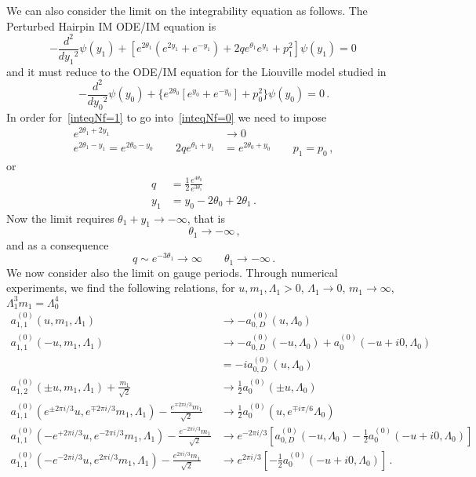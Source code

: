 \documentclass[11pt,a4paper]{elsarticle}
\def \th {\theta}
\def \ba {\begin{aligned}}
\def \ea {\end{aligned}}
\newcommand{\be}{\begin{equation}}
\newcommand{\ee}{\end{equation}}
\def\th{\theta}
\numberwithin{figure}{section}
\numberwithin{table}{section}
\begin{document}
We can also consider the limit on the integrability equation as follows. The Perturbed Hairpin IM ODE/IM equation is 
\be  \label{inteqNf=1}
-\frac{d^2}{d{y_1}^2} \psi(y_1) +[ e^{2\theta_1} (e^{2y_1}+e^{-y_1}) +2q e^{\theta_1}e^{y_1} + p^2_1]\psi(y_1) = 0 \,
\ee 
and it must reduce to the ODE/IM equation for the Liouville model studied in~\cite{FioravantiGregori:2019}
\be \label{inteqNf=0}
-\frac{d^2}{d{y_0}^2} \psi(y_0) +\{ e^{2\theta_0} [e^{y_0}+e^{-y_0}] + p^2_0\}\psi(y_0) = 0\,.
\ee 
In order for~\eqref{inteqNf=1} to go into~\eqref{inteqNf=0} we need to impose
\be 
\ba 
 e^{2\th_1+2 y_1} &\to 0
\\
 e^{2\th_1-y_1} = e^{2\th_0-y_0} \qquad
2 q e^{\th_1+y_1}&= e^{2\th_0+y_0} \qquad
p_1 = p_0\,,
\ea 
\ee 
or
\be
\ba 
q &= \frac{1}{2}\frac{e^{4\th_0}}{e^{3\th_1}}\\
y_1 &= y_0 -2 \th_0+2 \th_1 \,.
\ea
\ee
Now the limit requires $\th_1+y_1 \to -\infty$, that is %
\be 
 \qquad \th_1 \to - \infty\,,
\ee
and as a consequence 
\be 
q \sim e^{-3 \th_1} \to \infty \qquad \th_1 \to - \infty\,.
\ee 
We now consider also the limit on gauge periods. 
Through numerical experiments, we find the following relations, for $u,m_1,\Lambda_1 >0$, $\Lambda_1 \to 0$, $m_1 \to \infty$, $\Lambda_1^3 m_1 = \Lambda_0^4$
\begin{align}
    a_{1,1}^{(0)}(u,m_1,\Lambda_1) &\to -a_{0,D}^{(0)}(u,\Lambda_0) \\
    a_{1,1}^{(0)}(-u,m_1,\Lambda_1) &\to -a_{0,D}^{(0)}(-u,\Lambda_0)+a_{0}^{(0)}(-u+i 0,\Lambda_0)\\
    &=-i a_{0,D}^{(0)}(u,\Lambda_0) \\
     a_{1,2}^{(0)}(\pm u,m_1,\Lambda_1)+\frac{m_1}{\sqrt{2}} &\to \frac{1}{2}a_{0}^{(0)}(\pm u,\Lambda_0) \\
      a_{1,1}^{(0)}( e^{\pm 2\pi i/3}u,e^{\mp2\pi i/3}m_1,\Lambda_1)-\frac{e^{\mp2\pi i/3}m_1}{\sqrt{2}} &\to \frac{1}{2}a_{0}^{(0)}( u,e^{\mp i \pi/6}\Lambda_0) \\
        a_{1,1}^{(0)}( -e^{+ 2\pi i/3}u,e^{-2\pi i/3}m_1,\Lambda_1)-\frac{e^{-2\pi i/3}m_1}{\sqrt{2}} &\to e^{-2\pi i/3}[a_{0,D}^{(0)}( -u,\Lambda_0)- \frac{1}{2}a_{0}^{(0)}( -u+ i 0,\Lambda_0) ]\\
        a_{1,1}^{(0)}( -e^{- 2\pi i/3}u,e^{2\pi i/3}m_1,\Lambda_1)-\frac{e^{2\pi i/3}m_1}{\sqrt{2}} &\to e^{2\pi i/3}[-\frac{1}{2}a_{0}^{(0)}(- u+i 0,\Lambda_0) ]\,.
\end{align}
\end{document}
